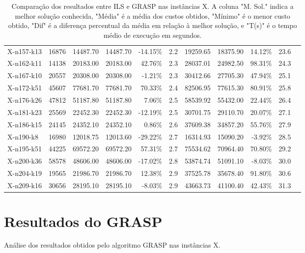 \documentclass[12pt,a4paper]{article}
\begin{document}
\begin{table}[htbp]
\begin{tabular}{@{}lrrrrrrrrrr@{}}
    X-n157-k13 & 16876 & 14487.70 & 14487.70 & -14.15\% & 2.2 & 19259.65 & 18375.90 & 14.12\% & 23.6 \\
    X-n162-k11 & 14138 & 20183.00 & 20183.00 & 42.76\% & 2.3 & 28037.01 & 24982.50 & 98.31\% & 24.3 \\
    X-n167-k10 & 20557 & 20308.00 & 20308.00 & -1.21\% & 2.3 & 30412.66 & 27705.30 & 47.94\% & 25.1 \\
    X-n172-k51 & 45607 & 77681.70 & 77681.70 & 70.33\% & 2.4 & 82506.95 & 77615.30 & 80.91\% & 25.8 \\
    X-n176-k26 & 47812 & 51187.80 & 51187.80 & 7.06\% & 2.5 & 58539.92 & 55432.00 & 22.44\% & 26.4 \\
    X-n181-k23 & 25569 & 22452.30 & 22452.30 & -12.19\% & 2.5 & 30701.75 & 29110.70 & 20.07\% & 27.1 \\
    X-n186-k15 & 24145 & 24352.10 & 24352.10 & 0.86\% & 2.6 & 37609.38 & 34857.20 & 55.76\% & 27.9 \\
    X-n190-k8 & 16980 & 12018.75 & 12013.60 & -29.22\% & 2.7 & 16314.93 & 15090.20 & -3.92\% & 28.5 \\
    X-n195-k51 & 44225 & 69572.20 & 69572.20 & 57.31\% & 2.7 & 75534.62 & 70964.40 & 70.80\% & 29.2 \\
    X-n200-k36 & 58578 & 48606.00 & 48606.00 & -17.02\% & 2.8 & 53874.74 & 51091.10 & -8.03\% & 30.0 \\
    X-n204-k19 & 19565 & 21986.70 & 21986.70 & 12.38\% & 2.9 & 37525.78 & 35678.40 & 91.80\% & 30.6 \\
    X-n209-k16 & 30656 & 28195.10 & 28195.10 & -8.03\% & 2.9 & 43663.73 & 41100.40 & 42.43\% & 31.3 \\
\bottomrule
\end{tabular}
\caption{Comparação dos resultados entre ILS e GRASP nas instâncias X. A coluna "M. Sol." indica a melhor solução conhecida, "Média" é a média dos custos obtidos, "Mínimo" é o menor custo obtido, "Dif" é a diferença percentual da média em relação à melhor solução, e "T(s)" é o tempo médio de execução em segundos.}
\label{tab:ils_vs_grasp}
\end{table}

\clearpage

\section{Resultados do GRASP}

Análise dos resultados obtidos pelo algoritmo GRASP nas instâncias X.
\end{document}
